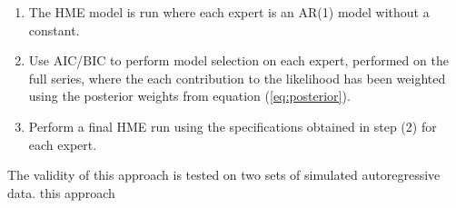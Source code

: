 \documentclass[12pt]{article}
\begin{document}
\begin{enumerate}
\item The HME model is run where each expert is an AR(1) model without a constant.
\item Use AIC/BIC to perform model selection on each expert, performed on the full series, where the each contribution to the likelihood has been weighted using the posterior weights from equation (\ref{eq:posterior}).
\item Perform a final HME run using the specifications obtained in step (2) for each expert.
\end{enumerate}

The validity of this approach is tested on two sets of simulated autoregressive data. this approach

\end{document}
